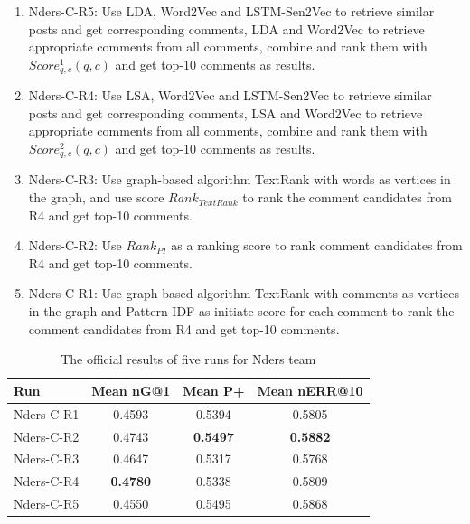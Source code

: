\documentclass{sig-alternate}
\begin{document}
\begin{enumerate}
  \item{Nders-C-R5: } Use LDA, Word2Vec and LSTM-Sen2Vec to retrieve similar posts 
  and get corresponding comments, LDA and Word2Vec to retrieve appropriate comments 
  from all comments, combine and rank them with $Score_{q,c}^1(q, c)$ and get top-10 comments as results.
  \item{Nders-C-R4: } Use LSA, Word2Vec and LSTM-Sen2Vec to retrieve similar posts 
  and get corresponding comments, LSA and Word2Vec to retrieve appropriate comments 
  from all comments, combine and rank them with $Score_{q,c}^2(q, c)$ and  get top-10 comments as results.
  \item{Nders-C-R3: } Use graph-based algorithm TextRank with words as vertices
  in the graph, and use score $Rank_{TextRank}$ to rank the comment candidates 
  from R4 and get top-10 comments.
  \item{Nders-C-R2: } Use $Rank_{PI}$ as a ranking score to rank comment 
  candidates from R4 and get top-10 comments.
  \item{Nders-C-R1: } Use graph-based algorithm TextRank with comments as 
  vertices in the graph and Pattern-IDF as initiate score for each comment to 
  rank the comment candidates from R4 and get top-10 comments.
\end{enumerate}

\begin{table}
\centering
\caption{The official results of five runs for Nders team}
\label{tab:commands}
\begin{minipage}{\columnwidth}
\begin{center}
\begin{tabular}{|l|c|c|c|}
\hline
 Run        &  Mean nG@1  &  Mean P+  &  Mean nERR@10  \\ \hline
 Nders-C-R1 & 0.4593 & 0.5394 & 0.5805 \\ \hline
 Nders-C-R2 & 0.4743 & \textbf{0.5497} & \textbf{0.5882} \\ \hline
 Nders-C-R3 & 0.4647 & 0.5317 & 0.5768 \\ \hline
 Nders-C-R4 & \textbf{0.4780} & 0.5338 & 0.5809 \\ \hline
 Nders-C-R5 & 0.4550 & 0.5495 & 0.5868 \\ \hline
\end{tabular}
\end{center}
\end{minipage}
\end{table}
\end{document}
